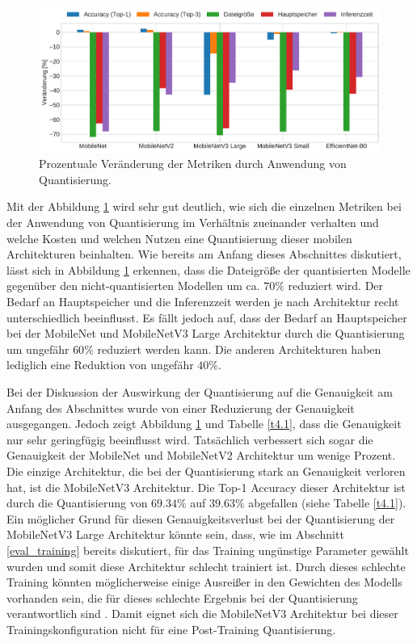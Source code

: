 \begin{figure}[htbp]
\centerline{\includegraphics[width=\textwidth]{content/images/quantization_improvements.pdf}}
\caption{Prozentuale Veränderung der Metriken durch Anwendung von Quantisierung.}
\label{f4.1}
\end{figure}

Mit der Abbildung \ref{f4.1} wird sehr gut deutlich, wie sich die einzelnen Metriken bei der Anwendung von Quantisierung im Verhältnis zueinander verhalten und welche Kosten und welchen Nutzen eine Quantisierung dieser mobilen Architekturen beinhalten. Wie bereits am Anfang dieses Abschnittes diskutiert, lässt sich in Abbildung \ref{f4.1} erkennen, dass die Dateigröße der quantisierten Modelle gegenüber den nicht-quantisierten Modellen um ca. $70\%$ reduziert wird. Der Bedarf an Hauptspeicher und die Inferenzzeit werden je nach Architektur recht unterschiedlich beeinflusst. Es fällt jedoch auf, dass der Bedarf an Hauptspeicher bei der MobileNet und MobileNetV3 Large Architektur durch die Quantisierung um ungefähr $60\%$ reduziert werden kann. Die anderen Architekturen haben lediglich eine Reduktion von ungefähr $40\%$.

Bei der Diskussion der Auswirkung der Quantisierung auf die Genauigkeit am Anfang des Abschnittes wurde von einer Reduzierung der Genauigkeit ausgegangen. Jedoch zeigt Abbildung \ref{f4.1} und Tabelle \ref{t4.1}, dass die Genauigkeit nur sehr geringfügig beeinflusst wird. Tatsächlich verbessert sich sogar die Genauigkeit der MobileNet und MobileNetV2 Architektur um wenige Prozent. Die einzige Architektur, die bei der Quantisierung stark an Genauigkeit verloren hat, ist die MobileNetV3 Architektur. Die Top-1 Accuracy dieser Architektur ist durch die Quantisierung von $69.34\%$ auf $39.63\%$ abgefallen (siehe Tabelle \ref{t4.1}). Ein möglicher Grund für diesen Genauigkeitsverlust bei der Quantisierung der MobileNetV3 Large Architektur könnte sein, dass, wie im Abschnitt \ref{eval_training} bereits diskutiert, für das Training ungünstige Parameter gewählt wurden und somit diese Architektur schlecht trainiert ist. Durch dieses schlechte Training könnten möglicherweise einige Ausreißer in den Gewichten des Modells vorhanden sein, die für dieses schlechte Ergebnis bei der Quantisierung verantwortlich sind \cite{jacob_quantization_2017}. Damit eignet sich die MobileNetV3 Architektur bei dieser Trainingskonfiguration nicht für eine Post-Training Quantisierung.

